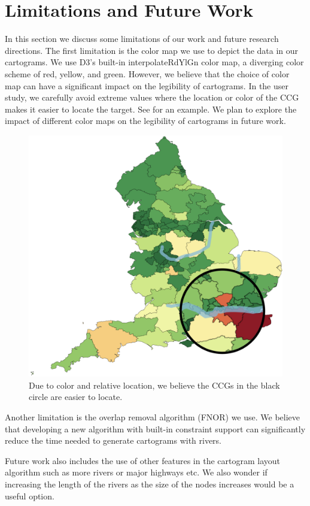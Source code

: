 \section{Limitations and Future Work}

In this section we discuss some limitations of our work and future research directions. The first limitation is the color map we use to depict the data in our cartograms. We use D3's built-in interpolateRdYlGn color map, a diverging color scheme of red, yellow, and green. However, we believe that the choice of color map can have a significant impact on the legibility of cartograms. In the user study, we carefully avoid extreme values where the location or color of the CCG makes it easier to locate the target. See  for an example. We plan to explore the impact of different color maps on the legibility of cartograms in future work.

{
    \begin{figure}[tb!]
        \centering
        \includegraphics[width=\columnwidth,keepaspectratio]{figure/limitations/extreme.png}
        \caption{Due to color and relative location, we believe the CCGs in the black circle are easier to locate.}
        \label{fig:extreme}
    \end{figure}
}

Another limitation is the overlap removal algorithm (FNOR) we use. We believe that developing a new algorithm with built-in constraint support can significantly reduce the time needed to generate cartograms with rivers.

Future work also includes the use of other features in the cartogram layout algorithm such as more rivers or major highways etc. We also wonder if increasing the length of the rivers as the size of the nodes increases would be a useful option.
